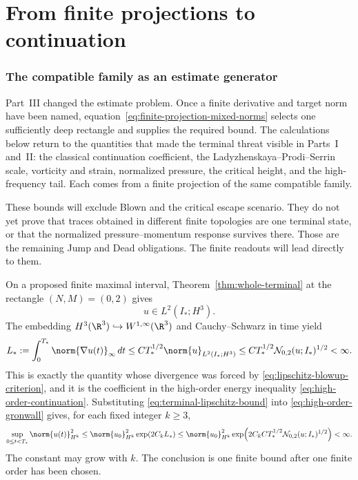 \part{From finite projections to continuation}

\section{The compatible family as an estimate generator}
\label{sec:whole-terminal-consequences}

Part~III changed the estimate problem.  Once a finite derivative and target
norm have been named, equation~\eqref{eq:finite-projection-mixed-norms}
selects one sufficiently deep rectangle and supplies the required bound.
The calculations below return to the quantities that made the terminal threat
visible in Parts~I and~II: the classical continuation coefficient, the
Ladyzhenskaya--Prodi--Serrin scale, vorticity and strain, normalized pressure,
the critical height, and the high-frequency tail.  Each comes from a finite
projection of the same compatible family.

These bounds will exclude Blown and the critical escape scenario.  They do not
yet prove that traces obtained in different finite topologies are one terminal
state, or that the normalized pressure--momentum response survives there.
Those are the remaining Jump and Dead obligations.  The finite readouts will
lead directly to them.

On a proposed finite maximal interval,
Theorem~\ref{thm:whole-terminal} at the rectangle
\((N,M)=(0,2)\) gives
\[
 u\in L^2(I_*;H^3).
\]
The embedding \(H^3(\R^3)\hookrightarrow W^{1,\infty}(\R^3)\) and
Cauchy--Schwarz in time yield
\begin{equation}
 L_*:=\int_0^{T_*}\norm{\nabla u(t)}_\infty\,dt
 \le C T_*^{1/2}\norm{u}_{L^2(I_*;H^3)}
 \le C T_*^{1/2}\mathcal N_{0,2}(u;I_*)^{1/2}<\infty.
 \label{eq:terminal-lipschitz-bound}
\end{equation}
This is exactly the quantity whose divergence was forced by
\eqref{eq:lipschitz-blowup-criterion}, and it is the coefficient in the
high-order energy inequality \eqref{eq:high-order-continuation}.  Substituting
\eqref{eq:terminal-lipschitz-bound} into
\eqref{eq:high-order-gronwall} gives, for each fixed integer \(k\ge3\),
\begin{equation}
 \sup_{0\le t<T_*}\norm{u(t)}_{H^k}^2
 \le \norm{u_0}_{H^k}^2\exp(2C_kL_*)
 \le \norm{u_0}_{H^k}^2
 \exp\!\left(
  2C_kC T_*^{1/2}\mathcal N_{0,2}(u;I_*)^{1/2}
 \right)<\infty.
 \label{eq:terminal-sobolev-bound}
\end{equation}
The constant may grow with \(k\).  The conclusion is one finite bound after
one finite order has been chosen.

